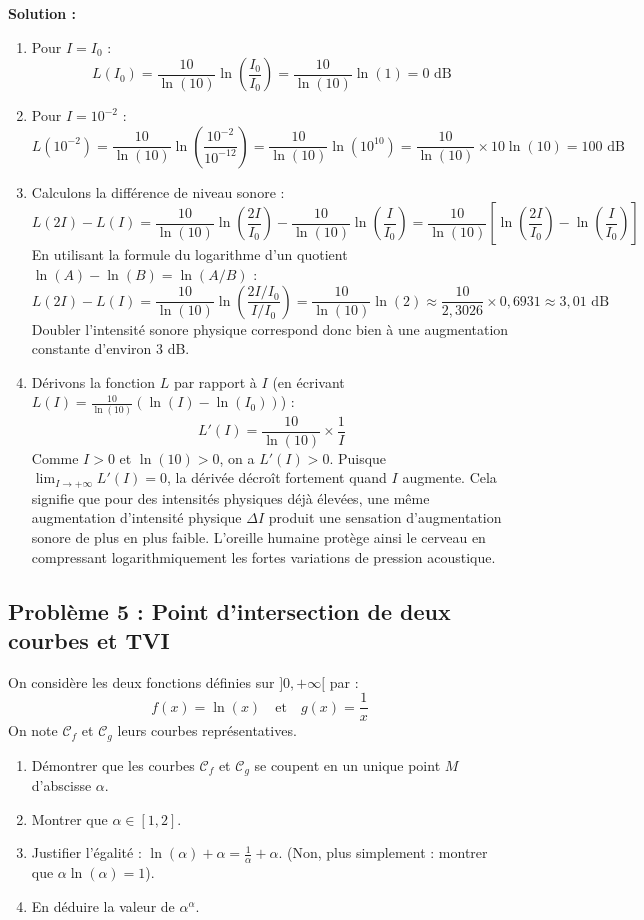 \textbf{Solution :}
\begin{enumerate}
    \item Pour $I = I_0$ :
    \[
    L(I_0) = \frac{10}{\ln(10)} \ln\left(\frac{I_0}{I_0}\right) = \frac{10}{\ln(10)} \ln(1) = 0 \text{ dB}
    \]
    
    \item Pour $I = 10^{-2}$ :
    \[
    L(10^{-2}) = \frac{10}{\ln(10)} \ln\left(\frac{10^{-2}}{10^{-12}}\right) = \frac{10}{\ln(10)} \ln(10^{10}) = \frac{10}{\ln(10)} \times 10\ln(10) = 100 \text{ dB}
    \]
    
    \item Calculons la différence de niveau sonore :
    \[
    L(2I) - L(I) = \frac{10}{\ln(10)} \ln\left(\frac{2I}{I_0}\right) - \frac{10}{\ln(10)} \ln\left(\frac{I}{I_0}\right) = \frac{10}{\ln(10)} \left[ \ln\left(\frac{2I}{I_0}\right) - \ln\left(\frac{I}{I_0}\right) \right]
    \]
    En utilisant la formule du logarithme d'un quotient $\ln(A) - \ln(B) = \ln(A/B)$ :
    \[
    L(2I) - L(I) = \frac{10}{\ln(10)} \ln\left( \frac{2I/I_0}{I/I_0} \right) = \frac{10}{\ln(10)} \ln(2) \approx \frac{10}{2,3026} \times 0,6931 \approx 3,01 \text{ dB}
    \]
    Doubler l'intensité sonore physique correspond donc bien à une augmentation constante d'environ 3 dB.
    
    \item Dérivons la fonction $L$ par rapport à $I$ (en écrivant $L(I) = \frac{10}{\ln(10)} (\ln(I) - \ln(I_0))$) :
    \[
    L'(I) = \frac{10}{\ln(10)} \times \frac{1}{I}
    \]
    Comme $I > 0$ et $\ln(10) > 0$, on a $L'(I) > 0$.
    Puisque $\lim_{I \to +\infty} L'(I) = 0$, la dérivée décroît fortement quand $I$ augmente.
    Cela signifie que pour des intensités physiques déjà élevées, une même augmentation d'intensité physique $\Delta I$ produit une sensation d'augmentation sonore de plus en plus faible. L'oreille humaine protège ainsi le cerveau en compressant logarithmiquement les fortes variations de pression acoustique.
\end{enumerate}

\subsection*{Problème 5 : Point d'intersection de deux courbes et TVI}
On considère les deux fonctions définies sur $]0, +\infty[$ par :
\[
f(x) = \ln(x) \quad \text{et} \quad g(x) = \frac{1}{x}
\]
On note $\mathcal{C}_f$ et $\mathcal{C}_g$ leurs courbes représentatives.
\begin{enumerate}
    \item Démontrer que les courbes $\mathcal{C}_f$ et $\mathcal{C}_g$ se coupent en un unique point $M$ d'abscisse $\alpha$.
    \item Montrer que $\alpha \in [1, 2]$.
    \item Justifier l'égalité : $\ln(\alpha) + \alpha = \frac{1}{\alpha} + \alpha$. (Non, plus simplement : montrer que $\alpha \ln(\alpha) = 1$).
    \item En déduire la valeur de $\alpha^{\alpha}$.
\end{enumerate}

